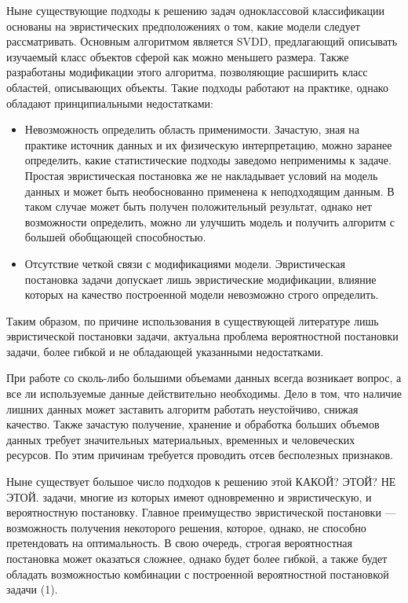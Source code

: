 \documentclass[12pt,a4paper]{article}
\begin{document}
	 Ныне существующие подходы к решению задач одноклассовой классификации основаны на эвристических предположениях о том, какие модели следует рассматривать. 
	Основным алгоритмом является SVDD, предлагающий описывать изучаемый класс объектов сферой как можно меньшего размера. 
	Также разработаны модификации этого алгоритма, позволяющие расширить класс областей, описывающих объекты. 
	Такие подходы работают на практике, однако обладают принципиальными недостатками:
	\begin{itemize}
		\item Невозможность определить область применимости. 
		Зачастую, зная на практике источник данных и их физическую интерпретацию, можно заранее определить, какие статистические подходы заведомо неприменимы к задаче. 
		Простая эвристическая постановка же не накладывает условий на модель данных и может быть необоснованно применена к неподходящим данным. 
		В таком случае может быть получен положительный результат, однако нет возможности определить, можно ли улучшить модель и получить алгоритм с большей обобщающей способностью.
		\item Отсутствие четкой связи с модификациями модели. Эвристическая постановка задачи допускает лишь эвристические модификации, влияние которых на качество построенной модели невозможно строго определить.
	\end{itemize}
	Таким образом, по причине использования в существующей литературе лишь эвристической постановки задачи, актуальна проблема вероятностной постановки задачи, более гибкой и не обладающей указанными недостатками.

	 При работе со сколь-либо большими объемами данных всегда возникает вопрос, а все ли используемые данные действительно необходимы. 
	Дело в том, что наличие лишних данных может заставить алгоритм работать неустойчиво, снижая качество. 
	Также зачастую получение, хранение и обработка больших объемов данных требует значительных материальных, временных и человеческих ресурсов. 
	По этим причинам требуется проводить отсев бесполезных признаков. 

	Ныне существует большое число подходов к решению этой КАКОЙ? ЭТОЙ? НЕ ЭТОЙ. задачи, многие из которых имеют одновременно и эвристическую, и вероятностную постановку. Главное преимущество эвристической постановки --- возможность получения некоторого решения, которое, однако, не способно претендовать на оптимальность. 
	В свою очередь, строгая вероятностная постановка может оказаться сложнее, однако будет более гибкой, а также будет обладать возможностью комбинации с построенной вероятностной постановкой задачи (1).
\end{document}
